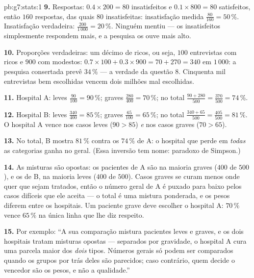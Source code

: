 \begin{solution}{pb:g7:stats:1}
\textbf{9.} Respostas: $0.4 \times 200 = 80$ insatisfeitos e
$0.1 \times 800 = 80$ satisfeitos, então $160$ respostas, das quais
$80$ insatisfeitas: insatisfação medida $\frac{80}{160} = 50\,\%$.
Insatisfação verdadeira: $\frac{200}{1\,000} = 20\,\%$. Ninguém mentiu
--- os insatisfeitos simplesmente respondem mais, e a pesquisa os ouve
mais alto.

\textbf{10.} Proporções verdadeiras: um décimo de ricos, ou seja, $100$
entrevistas com ricos e $900$ com modestos:
$0.7 \times 100 + 0.3 \times 900 = 70 + 270 = 340$ em $1\,000$: a
pesquisa consertada prevê $34\,\%$ --- a verdade da questão 8.
Cinquenta mil entrevistas bem escolhidas vencem dois milhões mal
escolhidas.

\textbf{11.} Hospital A: leves $\frac{90}{100} = 90\,\%$; graves
$\frac{280}{400} = 70\,\%$; no total
$\frac{90 + 280}{500} = \frac{370}{500} = 74\,\%$.

\textbf{12.} Hospital B: leves $\frac{340}{400} = 85\,\%$; graves
$\frac{65}{100} = 65\,\%$; no total
$\frac{340 + 65}{500} = \frac{405}{500} = 81\,\%$. O hospital A vence
nos casos leves ($90 > 85$) \emph{e} nos casos graves ($70 > 65$).

\textbf{13.} No total, B mostra $81\,\%$ contra os $74\,\%$ de A: o
hospital que perde em \emph{todas} as categorias ganha no geral. (Essa
inversão tem nome: paradoxo de Simpson.)

\textbf{14.} As misturas são opostas: os pacientes de A são na maioria
graves ($400$ de $500$), e os de B, na maioria leves ($400$ de $500$).
Casos graves se curam menos onde quer que sejam tratados, então o
número geral de A é puxado para baixo pelos casos difíceis que ele
aceita --- o total é uma mistura ponderada, e os pesos diferem entre os
hospitais. Um paciente grave deve escolher o hospital A: $70\,\%$ vence
$65\,\%$ na única linha que lhe diz respeito.

\textbf{15.} Por exemplo: ``A sua comparação mistura pacientes leves e
graves, e os dois hospitais tratam misturas opostas --- separados por
gravidade, o hospital A cura uma parcela maior dos \emph{dois} tipos.
Números gerais só podem ser comparados quando os grupos por trás deles
são parecidos; caso contrário, quem decide o vencedor são os pesos, e
não a qualidade.''
\end{solution}
